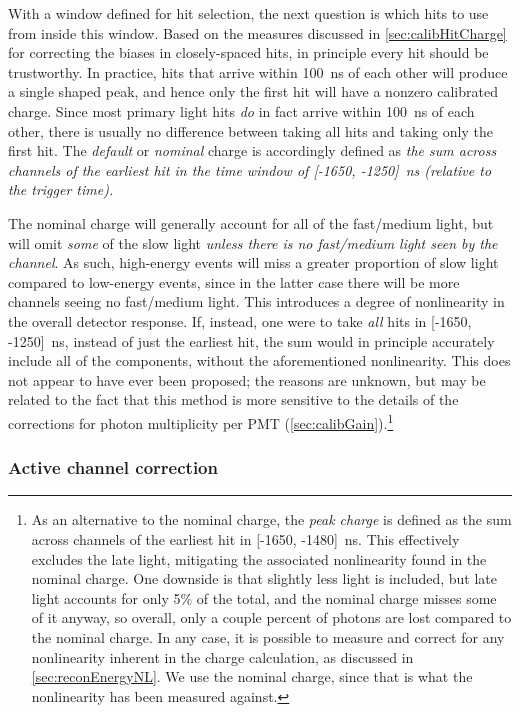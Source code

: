 \documentclass[../thesis.tex]{subfiles}
\begin{document}
With a window defined for hit selection, the next question is which hits to use from inside this window. Based on the measures discussed in \autoref{sec:calibHitCharge} for correcting the biases in closely-spaced hits, in principle every hit should be trustworthy. In practice, hits that arrive within 100~ns of each other will produce a single shaped peak, and hence only the first hit will have a nonzero calibrated charge. Since most primary light hits \emph{do} in fact arrive within 100~ns of each other, there is usually no difference between taking all hits and taking only the first hit. The \emph{default} or \emph{nominal} charge is accordingly defined as \emph{the sum across channels of the earliest hit in the time window of [-1650, -1250]~ns (relative to the trigger time).}

The nominal charge will generally account for all of the fast/medium light, but will omit \emph{some} of the slow light \emph{unless there is no fast/medium light seen by the channel}. As such, high-energy events will miss a greater proportion of slow light compared to low-energy events, since in the latter case there will be more channels seeing no fast/medium light. This introduces a degree of nonlinearity in the overall detector response. If, instead, one were to take \emph{all} hits in [-1650, -1250]~ns, instead of just the earliest hit, the sum would in principle accurately include all of the components, without the aforementioned nonlinearity. This does not appear to have ever been proposed; the reasons are unknown, but may be related to the fact that this method is more sensitive to the details of the corrections for photon multiplicity per PMT (\autoref{sec:calibGain}).\footnote{%
As an alternative to the nominal charge, the \emph{peak charge} is defined as the sum across channels of the earliest hit in [-1650, -1480]~ns. This effectively excludes the late light, mitigating the associated nonlinearity found in the nominal charge. One downside is that slightly less light is included, but late light accounts for only 5\% of the total, and the nominal charge misses some of it anyway, so overall, only a couple percent of photons are lost compared to the nominal charge. In any case, it is possible to measure and correct for any nonlinearity inherent in the charge calculation, as discussed in \autoref{sec:reconEnergyNL}. We use the nominal charge, since that is what the nonlinearity has been measured against.%
}


\subsubsection{Active channel correction}
\label{sec:reconActiveChan}
\end{document}
